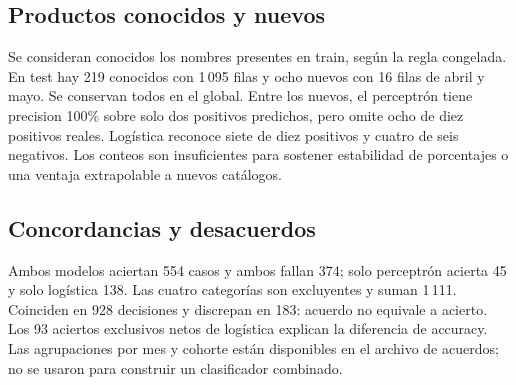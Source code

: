 \subsection{Productos conocidos y nuevos}

Se consideran conocidos los nombres presentes en train, según la regla congelada. En test hay 219 conocidos con 1\,095 filas y ocho nuevos con 16 filas de abril y mayo. Se conservan todos en el global. Entre los nuevos, el perceptrón tiene precision 100\% sobre solo dos positivos predichos, pero omite ocho de diez positivos reales. Logística reconoce siete de diez positivos y cuatro de seis negativos. Los conteos son insuficientes para sostener estabilidad de porcentajes o una ventaja extrapolable a nuevos catálogos.

\subsection{Concordancias y desacuerdos}
Ambos modelos aciertan 554 casos y ambos fallan 374; solo perceptrón acierta 45 y solo logística 138. Las cuatro categorías son excluyentes y suman 1\,111. Coinciden en 928 decisiones y discrepan en 183: acuerdo no equivale a acierto. Los 93 aciertos exclusivos netos de logística explican la diferencia de accuracy. Las agrupaciones por mes y cohorte están disponibles en el archivo de acuerdos; no se usaron para construir un clasificador combinado.

